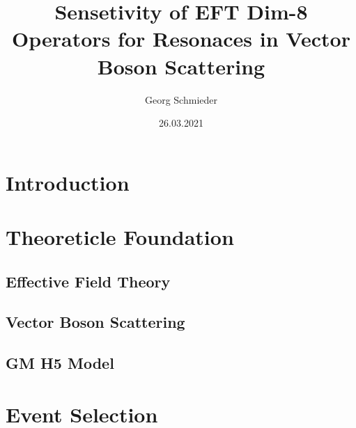 \documentclass[eng]{tudscrreprt}
\begin{document}
\date{26.03.2021}
\author{Georg Schmieder}
\title{Sensetivity of EFT Dim-8 Operators for Resonaces in Vector Boson Scattering}
\maketitle

\tableofcontents

\pagebreak
\chapter{Introduction}
    

\pagebreak
\chapter{Theoreticle Foundation}
    \section{Effective Field Theory}
        
    \pagebreak
    \section{Vector Boson Scattering}
        

    \pagebreak
    \section{GM H5 Model}
        
        
\pagebreak
\chapter{Event Selection}
    
\end{document}
